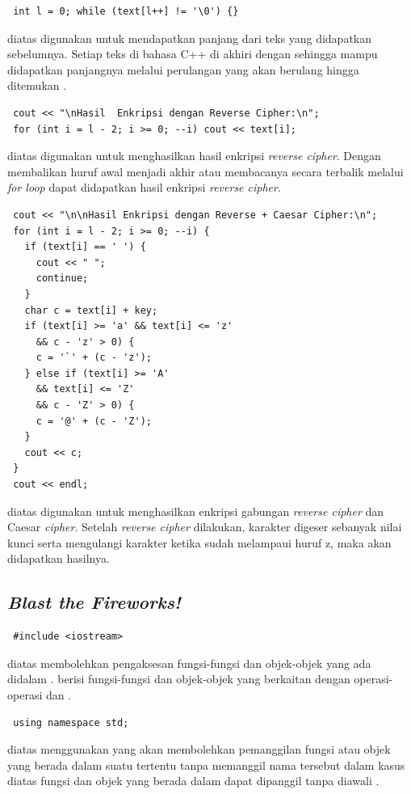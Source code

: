 \documentclass{subfiles}
\begin{document}
\begin{lstlisting}
 int l = 0; while (text[l++] != '\0') {}
\end{lstlisting}
\ilz{}{\Script} diatas digunakan untuk mendapatkan panjang dari teks yang didapatkan sebelumnya. Setiap teks di bahasa C++ di akhiri dengan  sehingga  mampu didapatkan panjangnya melalui perulangan yang akan berulang hingga ditemukan .

\begin{lstlisting}
 cout << "\nHasil  Enkripsi dengan Reverse Cipher:\n";
 for (int i = l - 2; i >= 0; --i) cout << text[i];
\end{lstlisting}
\ilz{}{\Script} diatas digunakan untuk menghasilkan hasil enkripsi \textit{reverse cipher}. Dengan membalikan huruf awal menjadi akhir atau membacanya secara terbalik melalui \textit{for loop} dapat didapatkan hasil enkripsi \textit{reverse cipher}.

\begin{lstlisting}
 cout << "\n\nHasil Enkripsi dengan Reverse + Caesar Cipher:\n";
 for (int i = l - 2; i >= 0; --i) {
   if (text[i] == ' ') {
     cout << " ";
     continue;
   }
   char c = text[i] + key;
   if (text[i] >= 'a' && text[i] <= 'z'
     && c - 'z' > 0) {
     c = '`' + (c - 'z');
   } else if (text[i] >= 'A'
     && text[i] <= 'Z'
     && c - 'Z' > 0) {
     c = '@' + (c - 'Z');
   }
   cout << c;
 }
 cout << endl;
\end{lstlisting}
\ilz{}{\Script} diatas digunakan untuk menghasilkan enkripsi gabungan \textit{reverse cipher} dan Caesar \textit{cipher}. Setelah \textit{reverse cipher} dilakukan, karakter digeser sebanyak nilai kunci serta mengulangi karakter ketika sudah melampaui huruf z, maka akan didapatkan hasilnya.

\subsection{\textit{Blast the Fireworks!}}
\begin{lstlisting}
 #include <iostream>
\end{lstlisting}
\ilz{}{\Script} diatas membolehkan pengaksesan fungsi-fungsi dan objek-objek yang ada didalam {\header} {\file} . {\Header} {\file}  berisi fungsi-fungsi dan objek-objek yang berkaitan dengan operasi-operasi {\ioi} dan {\ioo} {\stream}.

\begin{lstlisting}
 using namespace std;
\end{lstlisting}
\ilz{}{\Script} diatas menggunakan {\statement}  yang akan membolehkan pemanggilan fungsi atau objek yang berada dalam suatu  tertentu tanpa memanggil nama  tersebut dalam kasus diatas fungsi dan objek yang berada dalam  dapat dipanggil tanpa diawali .
\end{document}
